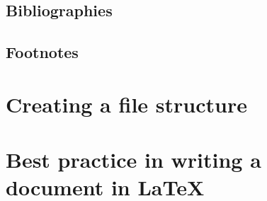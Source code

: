 \subsection{Bibliographies}\label{Sec:Bibliographies}


\subsection{Footnotes}


\section{Creating a file structure}\label{sec:FileStructure}


\section{Best practice in writing a document in LaTeX}
